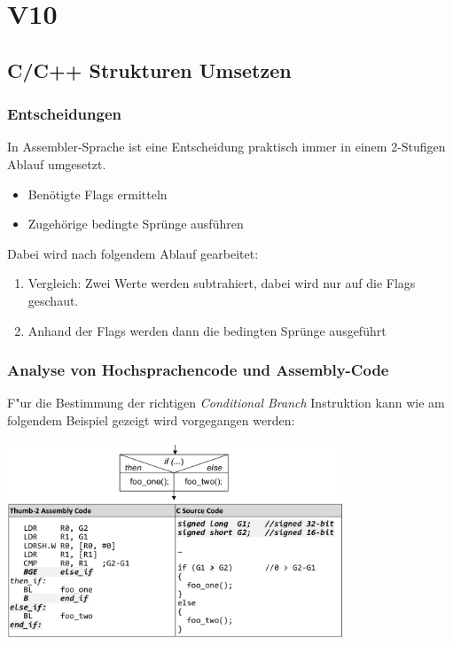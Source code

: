 \section{V10}
\subsection{C/C++ Strukturen Umsetzen}
\subsubsection{Entscheidungen}
In Assembler-Sprache ist eine Entscheidung praktisch immer in einem 2-Stufigen Ablauf umgesetzt.
\begin{itemize}
    \item Benötigte Flags ermitteln
    \item Zugehörige bedingte Sprünge ausführen
\end{itemize}

Dabei wird nach folgendem Ablauf gearbeitet:\\
\vspace{-0.5cm}
\begin{enumerate}
    \item Vergleich: Zwei Werte werden subtrahiert, dabei wird nur auf die Flags geschaut.
    \item Anhand der Flags werden dann die bedingten Sprünge ausgeführt
\end{enumerate}

\subsubsection{Analyse von Hochsprachencode und Assembly-Code}
F"ur die Bestimmung der richtigen \textit{Conditional Branch} Instruktion kann wie am folgendem Beispiel gezeigt wird vorgegangen werden:

\begin{center}
	\includegraphics[width=10cm]{images/Bsp_cpp-assembly}
\end{center}

